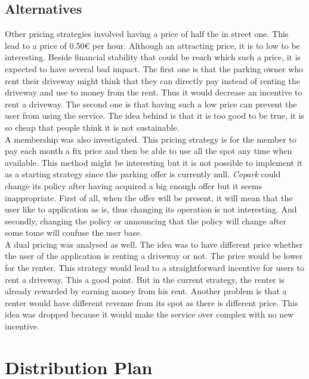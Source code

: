 \documentclass[12pt,a4paper,oneside]{book}
\newcommand{\bp}{\textit{Copark }}
\begin{document}
\subsection{Alternatives}

Other pricing strategies involved having a price of half the in street one. This lead to a price of 0.50\euro{} per hour. Although an attracting price, it is to low to be interesting. Beside financial stability that could be reach which such a price, it is expected to have several bad impact. The first one is that the parking owner who rent their driveway might think that they can directly pay instead of renting the driveway and use to money from the rent. Thus it would decrease an incentive to rent a driveway. The second one is that having such a low price can prevent the user from using the service. The idea behind is that it is too good to be true, it is so cheap that people think it is not sustainable.\\

A membership was also investigated. This pricing strategy is for the member to pay each month a fix price and then be able to use all the spot any time when available. This method might be interesting but it is not possible to implement it as a starting strategy since the parking offer is currently null. \bp could change its policy after having acquired a big enough offer but it seems inappropriate. First of all, when the offer will be present, it will mean that the user like to application as is, thus changing its operation is not interesting. And secondly, changing the policy or announcing that the policy will change after some tome will confuse the user base.\\

A dual pricing was analysed as well. The idea was to have different price whether the user of the application is renting a driveway or not. The price would be lower for the renter. This strategy would lead to a straightforward incentive for users to rent a driveway. This a good point. But in the current strategy, the renter is already rewarded by earning money from his rent. Another problem is that a renter would have different revenue from its spot as there is different price. This idea was dropped because it would make the service over complex with no new incentive.

\section{Distribution Plan}
\end{document}
